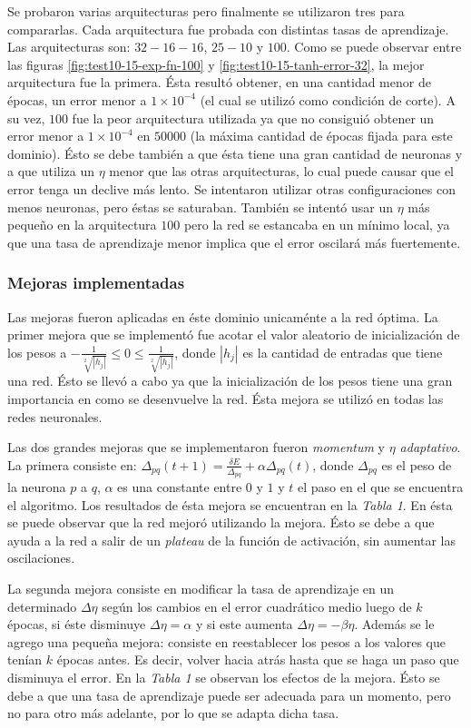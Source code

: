 \documentclass[12pt,a4paper]{article}
\begin{document}
Se probaron varias arquitecturas pero finalmente se utilizaron tres para compararlas. Cada arquitectura fue probada con distintas tasas de aprendizaje. Las arquitecturas son:  $32-16-16$, $25-10$ y $100$. Como se puede observar entre las figuras \ref{fig:test10-15-exp-fn-100} y \ref{fig:test10-15-tanh-error-32}, la mejor arquitectura fue la primera. Ésta resultó obtener, en una cantidad menor de épocas, un error menor a $1\times10^{-4}$ (el cual se utilizó como condición de corte). A su vez, $100$ fue la peor arquitectura utilizada ya que no consiguió obtener un error menor a $1\times10^{-4}$ en $50000$ (la máxima cantidad de épocas fijada para este dominio). Ésto se debe también a que ésta tiene una gran cantidad de neuronas y a que utiliza un $\eta$ menor que las otras arquitecturas, lo cual puede causar que el error tenga un declive más lento. Se intentaron utilizar otras configuraciones con menos neuronas, pero éstas se saturaban. También se intentó usar un $\eta$ más pequeño en la arquitectura $100$ pero la red se estancaba en un mínimo local, ya que una tasa de aprendizaje menor implica que el error oscilará más fuertemente.

\subsubsection{Mejoras implementadas}

Las mejoras fueron aplicadas en éste dominio unicaménte a la red óptima. La primer mejora que se implementó fue acotar el valor aleatorio de inicialización  de los pesos a $-\frac{1}{\sqrt[2]{|h_j|}} \leq 0 \leq \frac{1}{\sqrt[2]{|h_j|}}$, donde $|h_j|$ es la cantidad de entradas que tiene una red. Ésto se llevó a cabo ya que la inicialización de los pesos tiene una gran importancia en como se desenvuelve la red. Ésta mejora se utilizó en todas las redes neuronales.

Las dos grandes mejoras que se implementaron fueron \emph{momentum} y \emph{$\eta$ adaptativo}. La primera consiste en: $\Delta_{pq}(t + 1) = \frac{\delta E}{\Delta_{pq}} + \alpha  \Delta_{pq}(t)$, donde $\Delta_{pq}$ es el peso de la neurona $p$ a $q$, $\alpha$ es una constante entre $0$ y $1$ y $t$ el paso en el que se encuentra el algoritmo. Los resultados de ésta mejora se encuentran en la \emph{Tabla 1}. En ésta se puede observar que la red mejoró utilizando la mejora. Ésto se debe a que ayuda a la red a salir de un \emph{plateau} de la función de activación, sin aumentar las oscilaciones.

La segunda mejora consiste en modificar la tasa de aprendizaje en un determinado $\Delta \eta$ según los cambios en el error cuadrático medio luego de $k$ épocas, si éste disminuye $\Delta \eta = \alpha$ y si este aumenta $\Delta \eta = -\beta \eta$. Además se le agrego una pequeña mejora: consiste en reestablecer los pesos a los valores que tenían $k$ épocas antes. Es decir, volver hacia atrás hasta que se haga un paso que disminuya el error. En la \emph{Tabla 1} se observan los efectos de la mejora. Ésto se debe a que una tasa de aprendizaje puede ser adecuada para un momento, pero no para otro más adelante, por lo que se adapta dicha tasa.
\end{document}
